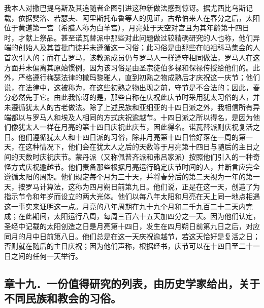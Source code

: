 我本人对撒巴提乌斯及其追随者企图引进这种新做法感到惊讶。据尤西比乌斯记载，依据斐洛、若瑟夫、阿里斯托布鲁等人的见证，古希伯来人在春分之后，太阳位于黄道第一宫（希腊人称为白羊宫），月亮处于天空对宫且为其年龄第十四日时，才献上祭品。甚至诺瓦替派中那些对此问题做过较精确研究的人也称，他们异端的创始人及其首批门徒并未遵循这一习俗；此习俗是由那些在帕祖科马集会的人首次引入的；而在古罗马，该教派成员仍与罗马人一样遵守相同做法，罗马人在这方面并未偏离其原始惯例，因为该习俗是由圣宗徒伯多禄和保禄传授给他们的。此外，严格遵行梅瑟法律的撒玛黎雅人，直到初熟之物成熟后才庆祝这一庆节；他们说，在法律中，这被称为，在这些初熟之物出现之前，守节是不合法的；因此，春分必然先于它。由此我惊讶的是，那些自称在庆祝此庆节时采用犹太习俗的人，并未遵循犹太人的古老做法。除了上述民族和亚细亚的十四日派之外，我相信所有异端都以与罗马人和埃及人相同的方式庆祝逾越节。十四日派之所以得名，是因为他们像犹太人一样在月亮的第十四日庆祝此庆节，因此得名。诺瓦替派则庆祝复活之日。他们遵循犹太人和十四日派的习俗，除非月亮第十四日恰好落在一周的第一天，在这种情况下，他们会在犹太人之后的天数等于月亮第十四日与随后的主日之间的天数时庆祝庆节。蒙丹派（又称佩普齐派和弗吕家派）按照他们引入的一种奇怪方式庆祝逾越节。他们责备那些根据月亮运行确定庆节时间的人，并断言应完全遵循太阳的周期。他们规定每个月为三十天，并将春分后的第二天视为一年的第一天，按罗马计算法，这称为四月朔日前第九日。他们说，正是在这一天，创造了为指示节令和年岁而设立的两大光体。他们以每八年太阳和月亮在天上同一地点相遇这一事实来证明这一点。月亮的八年周期在九十九个月和二千九百二十二天内完成；在此期间，太阳运行八周，每周三百六十五天加四分之一天。因为他们认定，圣经中记载的太阳创造之日是月亮第十四日，发生在四月朔日前第九日之后，对应同月的月中日前第八日。他们总是在这一天庆祝逾越节，若这天恰好是复活之日；否则就在随后的主日庆祝；因为他们声称，根据经书，庆节可以在十四日至二十一日之间的任何一天举行。\par


\subsection{章十九．一份值得研究的列表，由历史学家给出，关于不同民族和教会的习俗。}


